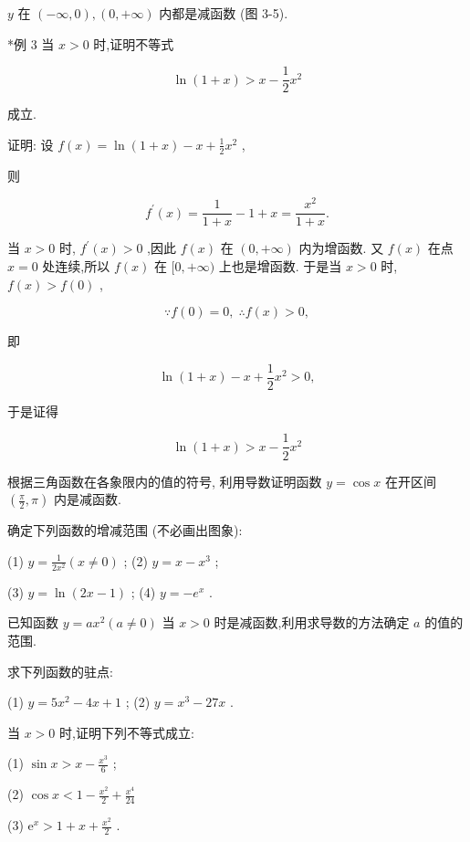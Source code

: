 \documentclass[lang=cn,newtx,10pt,scheme=chinese]{elegantbook}
\begin{document}
\(y\) 在 \(\left( {-\infty ,0}\right) ,\left( {0, + \infty }\right)\) 内都是减函数 (图 3-5).

*例 3 当 \(x > 0\) 时,证明不等式

\[
\ln \left( {1 + x}\right) > x - \frac{1}{2}{x}^{2}
\]

成立.

证明: 设 \(f\left( x\right) = \ln \left( {1 + x}\right) - x + \frac{1}{2}{x}^{2}\) ,

则

\[
{f}^{\prime }\left( x\right) = \frac{1}{1 + x} - 1 + x = \frac{{x}^{2}}{1 + x}.
\]

当 \(x > 0\) 时, \({f}^{\prime }\left( x\right) > 0\) ,因此 \(f\left( x\right)\) 在 \(\left( {0, + \infty }\right)\) 内为增函数. 又 \(f\left( x\right)\) 在点 \(x = 0\) 处连续,所以 \(f\left( x\right)\) 在 \(\lbrack 0, + \infty )\) 上也是增函数. 于是当 \(x > 0\) 时, \(f\left( x\right) > f\left( 0\right)\) ,

\[
\because f\left( 0\right) = 0,\;\therefore f\left( x\right) > 0,
\]

即

\[
\ln \left( {1 + x}\right) - x + \frac{1}{2}{x}^{2} > 0,
\]

于是证得

\[
\ln \left( {1 + x}\right) > x - \frac{1}{2}{x}^{2}
\]

\begin{problemset}[练习]

\item 根据三角函数在各象限内的值的符号, 利用导数证明函数 \(y = \cos x\) 在开区间 \(\left( {\frac{\pi }{2},\pi }\right)\) 内是减函数.

\item 确定下列函数的增减范围 (不必画出图象):

(1) \(y = \frac{1}{2{x}^{2}}\left( {x \neq 0}\right)\) ; (2) \(y = x - {x}^{3}\) ;

(3) \(y = \ln \left( {{2x} - 1}\right)\) ; (4) \(y = - {e}^{x}\) .

\item 已知函数 \(y = a{x}^{2}\left( {a \neq 0}\right)\) 当 \(x > 0\) 时是减函数,利用求导数的方法确定 \(a\) 的值的范围.

\item 求下列函数的驻点:

(1) \(y = 5{x}^{2} - {4x} + 1\) ; (2) \(y = {x}^{3} - {27x}\) .

\item* 当 \(x > 0\) 时,证明下列不等式成立:

(1) \(\sin x > x - \frac{{x}^{3}}{6}\) ;

(2) \(\cos x < 1 - \frac{{x}^{2}}{2} + \frac{{x}^{4}}{24}\)

(3) \({\mathrm{e}}^{x} > 1 + x + \frac{{x}^{2}}{2}\) .


\end{problemset}
\end{document}
